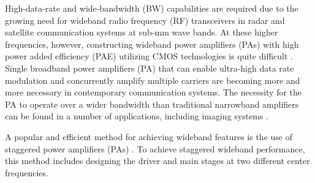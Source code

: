  High-data-rate and wide-bandwidth (BW) capabilities are required due to the growing need for wideband radio frequency (RF) transceivers in radar and satellite communication systems at sub-mm wave bands. At these higher frequencies, however, constructing wideband power amplifiers (PAs) with high power added efficiency (PAE) utilizing CMOS technologies is quite difficult \cite{8886521, 8354388, 9354447}.
Single broadband power amplifiers (PA) that can enable ultra-high data rate modulation and concurrently amplify multiple carriers are becoming more and more necessary in contemporary communication systems. The necessity for the PA to operate over a wider bandwidth than traditional narrowband amplifiers can be found in a number of applications, including imaging systems \cite{4977464}.

A popular and efficient method for achieving wideband features is the use of staggered power amplifiers (PAs) \cite{8678458, sapawl2012}. To achieve staggered wideband performance, this method includes designing the driver and main stages at two different center frequencies.

